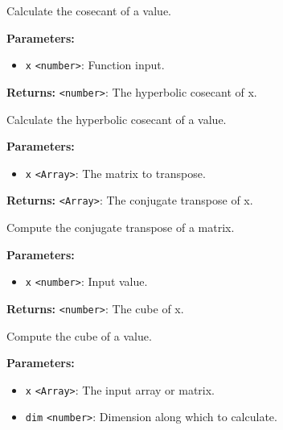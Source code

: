 \documentclass[12pt,a4paper]{article}
\begin{document}
\noindent Calculate the cosecant of a value.

\vspace{5mm}
\noindent {}


\noindent \textbf{Parameters:}
\begin{itemize}
  \item \texttt{x} \texttt{<number>}: Function input.
\end{itemize}

\noindent \textbf{Returns:} \texttt{<number>}: The hyperbolic cosecant of x.

\noindent Calculate the hyperbolic cosecant of a value.

\vspace{5mm}
\noindent {}


\noindent \textbf{Parameters:}
\begin{itemize}
  \item \texttt{x} \texttt{<Array>}: The matrix to transpose.
\end{itemize}

\noindent \textbf{Returns:} \texttt{<Array>}: The conjugate transpose of x.

\noindent Compute the conjugate transpose of a matrix.

\vspace{5mm}
\noindent {}


\noindent \textbf{Parameters:}
\begin{itemize}
  \item \texttt{x} \texttt{<number>}: Input value.
\end{itemize}

\noindent \textbf{Returns:} \texttt{<number>}: The cube of x.

\noindent Compute the cube of a value.

\vspace{5mm}
\noindent {}


\noindent \textbf{Parameters:}
\begin{itemize}
  \item \texttt{x} \texttt{<Array>}: The input array or matrix.
  \item \texttt{dim} \texttt{<number>}: Dimension along which to calculate.
\end{itemize}
\end{document}
